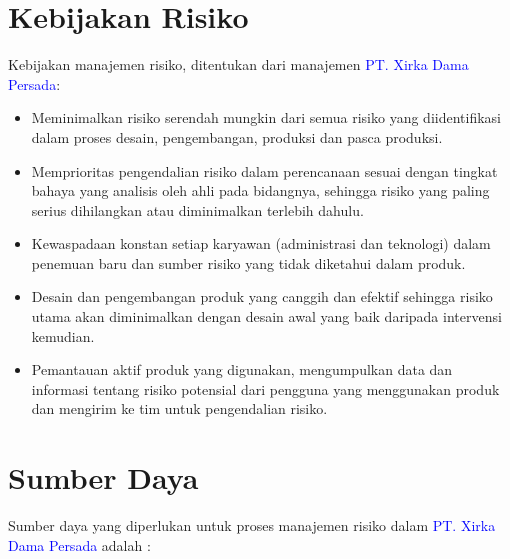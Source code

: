 \documentclass[11pt,a4paper,twoside,onecolumn]{book}
\begin{document}
		\section{Kebijakan Risiko}
		Kebijakan manajemen risiko, ditentukan dari manajemen \textcolor{blue}{PT. Xirka Dama Persada}:
		\begin{itemize}
			\item Meminimalkan risiko serendah mungkin dari semua risiko yang diidentifikasi dalam proses desain, pengembangan, produksi dan pasca produksi.
			\item Memprioritas pengendalian risiko dalam perencanaan sesuai dengan tingkat bahaya yang analisis oleh ahli pada bidangnya, sehingga risiko yang paling serius dihilangkan atau diminimalkan terlebih dahulu.
			\item Kewaspadaan konstan setiap karyawan (administrasi dan teknologi) dalam penemuan baru dan sumber risiko yang tidak diketahui dalam produk.
			\item Desain dan pengembangan produk yang canggih dan efektif sehingga risiko utama akan diminimalkan dengan desain awal yang baik daripada intervensi kemudian.
			\item Pemantauan aktif produk yang digunakan, mengumpulkan data dan informasi tentang risiko potensial dari pengguna yang menggunakan produk dan mengirim ke tim untuk pengendalian risiko.
		\end{itemize}
		
		\section{Sumber Daya}
		Sumber daya yang diperlukan untuk proses manajemen risiko dalam \textcolor{blue}{PT. Xirka Dama Persada} adalah :
		
\end{document}
